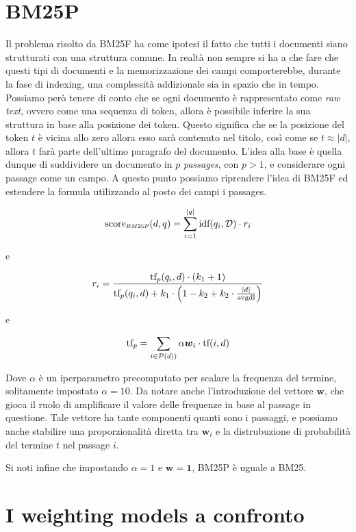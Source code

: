 \section{BM25P}
Il problema risolto da BM25F ha come ipotesi il fatto che tutti i documenti siano strutturati con una struttura comune.
In realtà non sempre si ha a che fare che questi tipi di documenti e la memorizzazione dei campi comporterebbe, durante
la fase di indexing, una complessità addizionale sia in spazio che in tempo.
Possiamo però tenere di conto che se ogni documento è rappresentato come \textit{raw text}, ovvero come una sequenza
di token, allora è possibile inferire la sua struttura in base alla posizione dei token.
Questo significa che se la posizione del token $t$ è vicina allo zero allora esso sarà contenuto nel titolo, così come
se $t \approx \left|d\right|$, allora $t$ farà parte dell'ultimo paragrafo del documento.
L'idea alla base è quella dunque di suddividere un documento in $p$ \textit{passages}, con $p>1$, e
considerare ogni passage come un campo. A questo punto possiamo riprendere l'idea di BM25F
ed estendere la formula utilizzando al posto dei campi i passages.

\begin{definizione}[BM25 Passages]\label{def:bm25p}
		$$
	\sco_{\scaleto{BM25P}{4pt}}(d, q) = \sum_{i=1}^{|q|} \text{idf}(q_i, \mathcal{D}) \cdot r_i
	$$
	
	e
	
	$$
	r_i = \frac{
		\text{tf}_p(q_i, d) \cdot (k_1 +1)
	}{
		\text{tf}_p(q_i, d) + k_1 \cdot \left(1-k_2 + k_2 \cdot \frac{\left|d\right|}{\text{avgdl}}\right)
	}
	$$
	
	e
	
	$$
	\text{tf}_p = \sum_{i \in \mathcal{P}(d))}{\alpha \boldsymbol{w}_i \cdot \text{tf}(i, d)}
	$$
	
	Dove $\alpha$ è un iperparametro precomputato per scalare la frequenza del termine, solitamente impostato $\alpha = 10$.
	Da notare anche l'introduzione del vettore $\boldsymbol{w}$, che gioca il ruolo di amplificare il valore delle frequenze
	in base al passage in questione.
	Tale vettore ha tante componenti quanti sono i passaggi, e possiamo anche stabilire una proporzionalità
	diretta tra $\boldsymbol{w}_i$ e la distrubuzione di probabilità del termine $t$ nel passage $i$.
	
	Si noti infine che impostando $\alpha=1$ e $\boldsymbol{w} = \boldsymbol{1}$, BM25P è uguale a BM25.
\end{definizione}

\section{I weighting models a confronto}
 
